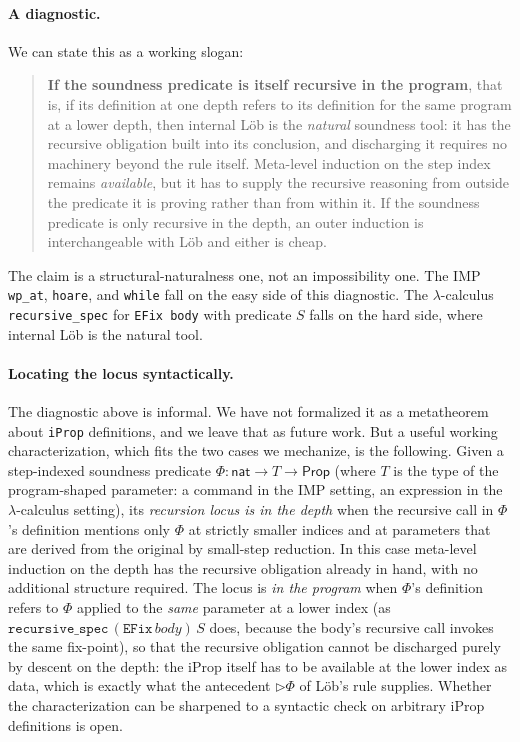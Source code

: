 \paragraph{A diagnostic.}
We can state this as a working slogan:
\begin{quote}
\textbf{If the soundness predicate is itself recursive in the
program}, that is, if its definition at one depth refers to its
definition for the same program at a lower depth, then internal Löb is
the \emph{natural} soundness tool: it has the recursive obligation built
into its conclusion, and discharging it requires no machinery beyond
the rule itself.  Meta-level induction on the step index remains
\emph{available}, but it has to supply the recursive reasoning from
outside the predicate it is proving rather than from within it.  If the soundness
predicate is only recursive in the depth, an outer induction is
interchangeable with Löb and either is cheap.
\end{quote}
The claim is a structural-naturalness one, not an impossibility one.
The IMP \texttt{wp\_at}, \texttt{hoare}, and \texttt{while} fall on
the easy side of this diagnostic.  The
$\lambda$-calculus \texttt{recursive\_spec} for \texttt{EFix body}
with predicate $S$ falls on the hard side, where internal Löb is the
natural tool.

\paragraph{Locating the locus syntactically.}
The diagnostic above is informal. We have not formalized it as a
metatheorem about \texttt{iProp} definitions, and we leave that as
future work.  But a useful working characterization, which fits the
two cases we mechanize, is the following.  Given a step-indexed
soundness predicate $\Phi : \mathsf{nat} \to T \to \mathsf{Prop}$
(where $T$ is the type of the program-shaped parameter: a command
in the IMP setting, an expression in the $\lambda$-calculus setting),
its \emph{recursion locus is in the depth} when the recursive call
in $\Phi$'s definition mentions only $\Phi$ at strictly smaller
indices and at parameters that are derived from the original by
small-step reduction. In this case meta-level induction on the
depth has the recursive obligation already in hand, with no
additional structure required.  The locus is \emph{in the program}
when $\Phi$'s definition refers to $\Phi$ applied to the
\emph{same} parameter at a lower index (as
$\mathtt{recursive\_spec}\,(\mathtt{EFix}\, body)\, S$ does, because
the body's recursive call invokes the same fix-point), so that the
recursive obligation cannot be discharged purely by descent on the
depth: the iProp itself has to be available at the lower index
as data, which is exactly what the antecedent
$\triangleright \Phi$ of Löb's rule supplies.  Whether the
characterization can be sharpened to a syntactic check on arbitrary
iProp definitions is open.

